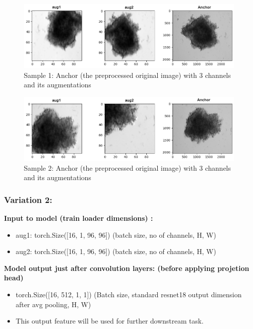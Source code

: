 \documentclass[12pt,twoside,a4paper,parskip]{scrbook} %
\begin{document}
\begin{figure}[H]
  \centering
  \includegraphics[width=0.9\linewidth]{figures/3_1.png} %
  \caption{Sample 1: Anchor (the preprocessed original image) with 3 channels and its augmentations}
  \label{fig:augmentation}
\end{figure}


  \begin{figure}[H]
    \centering
    \includegraphics[width=0.9\linewidth]{figures/3_2fine.png} %
    \caption{Sample 2: Anchor (the preprocessed original image) with 3 channels and its augmentations}
    \label{fig:augmentations}
  \end{figure}
\subsubsection{Variation 2:}

\textbf{Input to model (train loader dimensions) :} 
\begin{itemize}
   \item aug1: torch.Size([16, 1, 96, 96])        (batch size, no of channels, H, W)
   \item aug2: torch.Size([16, 1, 96, 96])        (batch size, no of channels, H, W) \vspace{1em}
\end{itemize}
\textbf{Model output just after convolution layers: (before applying projetion head)} 
\begin{itemize}
  \item torch.Size([16, 512, 1, 1]) (Batch size, standard resnet18 output dimension after avg pooling, H, W)   
  \item This output feature will be used for further downstream task.  \vspace{1em}
\end{itemize}
\end{document}
